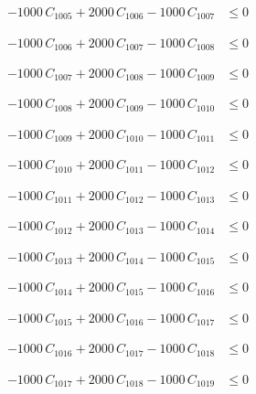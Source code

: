\documentclass[a4paper,11pt]{article}
\begin{document}
\begin{align}
-1000\,C_{1005} + 2000\,C_{1006} - 1000\,C_{1007} &\leq 0 \nonumber
\end{align}

\begin{align}
-1000\,C_{1006} + 2000\,C_{1007} - 1000\,C_{1008} &\leq 0 \nonumber
\end{align}

\begin{align}
-1000\,C_{1007} + 2000\,C_{1008} - 1000\,C_{1009} &\leq 0 \nonumber
\end{align}

\begin{align}
-1000\,C_{1008} + 2000\,C_{1009} - 1000\,C_{1010} &\leq 0 \nonumber
\end{align}

\begin{align}
-1000\,C_{1009} + 2000\,C_{1010} - 1000\,C_{1011} &\leq 0 \nonumber
\end{align}

\begin{align}
-1000\,C_{1010} + 2000\,C_{1011} - 1000\,C_{1012} &\leq 0 \nonumber
\end{align}

\begin{align}
-1000\,C_{1011} + 2000\,C_{1012} - 1000\,C_{1013} &\leq 0 \nonumber
\end{align}

\begin{align}
-1000\,C_{1012} + 2000\,C_{1013} - 1000\,C_{1014} &\leq 0 \nonumber
\end{align}

\begin{align}
-1000\,C_{1013} + 2000\,C_{1014} - 1000\,C_{1015} &\leq 0 \nonumber
\end{align}

\begin{align}
-1000\,C_{1014} + 2000\,C_{1015} - 1000\,C_{1016} &\leq 0 \nonumber
\end{align}

\begin{align}
-1000\,C_{1015} + 2000\,C_{1016} - 1000\,C_{1017} &\leq 0 \nonumber
\end{align}

\begin{align}
-1000\,C_{1016} + 2000\,C_{1017} - 1000\,C_{1018} &\leq 0 \nonumber
\end{align}

\begin{align}
-1000\,C_{1017} + 2000\,C_{1018} - 1000\,C_{1019} &\leq 0 \nonumber
\end{align}
\end{document}
